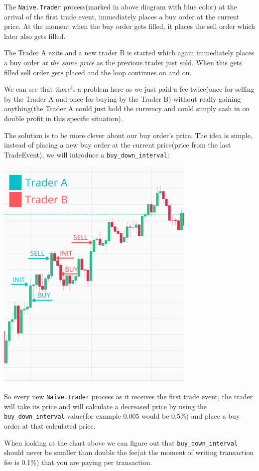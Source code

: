 \documentclass[
  oneside]{book}
\begin{document}
The \texttt{Naive.Trader} process(marked in above diagram with blue color) at the arrival of the first trade event, immediately places a buy order at the current price. At the moment when the buy order gets filled, it places the sell order which later also gets filled.

The Trader A exits and a new trader B is started which again immediately places a buy order \emph{at the same price} as the previous trader just sold. When this gets filled sell order gets placed and the loop continues on and on.

We can see that there's a problem here as we just paid a fee twice(once for selling by the Trader A and once for buying by the Trader B) without really gaining anything(the Trader A could just hold the currency and could simply cash in on double profit in this specific situation).

\newpage

The solution is to be more clever about our buy order's price. The idea is simple, instead of placing a new buy order at the current price(price from the last TradeEvent), we will introduce a \texttt{buy\_down\_interval}:

\begin{center}\includegraphics[width=0.5\linewidth]{images/chapter_06_02_rebuy_expl} \end{center}

So every new \texttt{Naive.Trader} process as it receives the first trade event, the trader will take its price and will calculate a decreased price by using the \texttt{buy\_down\_interval} value(for example 0.005 would be 0.5\%) and place a buy order at that calculated price.

When looking at the chart above we can figure out that \texttt{buy\_down\_interval} should never be smaller than double the fee(at the moment of writing transaction fee is 0.1\%) that you are paying per transaction.
\end{document}
